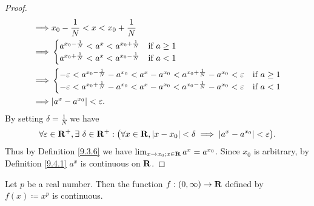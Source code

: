 \begin{proof}
\begin{align*}
        \implies & x_0 - \frac{1}{N} < x < x_0 + \frac{1}{N}                                                                                                                  \\
        \implies & \begin{cases}
                       a^{x_0 - \frac{1}{N}} < a^{x} < a^{x_0 + \frac{1}{N}} & \text{if } a \geq 1 \\
                       a^{x_0 + \frac{1}{N}} < a^{x} < a^{x_0 - \frac{1}{N}} & \text{if } a < 1
                   \end{cases}                                                          \\
        \implies & \begin{cases}
                       -\varepsilon < a^{x_0 - \frac{1}{N}} - a^{x_0} < a^x - a^{x_0} < a^{x_0 + \frac{1}{N}} - a^{x_0} < \varepsilon & \text{if } a \geq 1 \\
                       -\varepsilon < a^{x_0 + \frac{1}{N}} - a^{x_0} < a^x - a^{x_0} < a^{x_0 - \frac{1}{N}} - a^{x_0} < \varepsilon & \text{if } a < 1
                   \end{cases} \\
        \implies & \abs{a^x - a^{x_0}} < \varepsilon.
    \end{align*}
    By setting \(\delta = \frac{1}{N}\) we have
    \[
        \forall \varepsilon \in \mathbf{R}^+, \exists\ \delta \in \mathbf{R}^+ : \big(\forall x \in \mathbf{R}, \left\lvert x - x_0\right\rvert < \delta \implies \left\lvert a^x - a^{x_0}\right\rvert < \varepsilon\big).
    \]
    Thus by Definition \ref{9.3.6} we have \(\lim_{x \to x_0 ; x \in \mathbf{R}} a^x = a^{x_0}\).
    Since \(x_0\) is arbitrary, by Definition \ref{9.4.1} \(a^x\) is continuous on \(\mathbf{R}\).
\end{proof}

\begin{proposition}\label{9.4.11}
    Let \(p\) be a real number.
    Then the function \(f : (0, \infty) \to \mathbf{R}\) defined by \(f(x) \coloneqq x^p\) is continuous.
\end{proposition}

